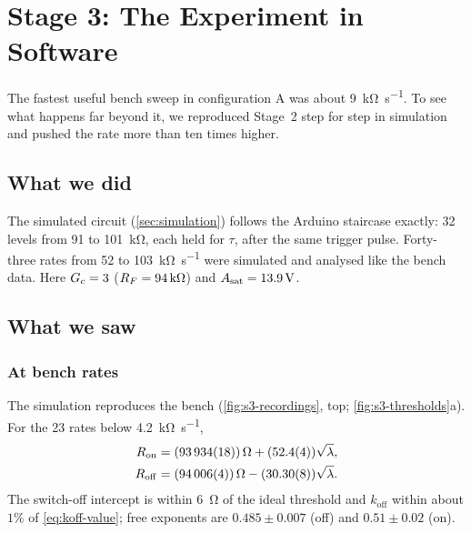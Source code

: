 \chapter{Stage 3: The Experiment in Software}\label{ch:stage3}
\chapterlists

The fastest useful bench sweep in configuration A was about \SI{9}{\kilo\ohm\per\second}. To see what
happens far beyond it, we reproduced Stage~2 step for step in simulation and pushed the rate more than
ten times higher.

\section{What we did}\label{sec:s3-setup}

The simulated circuit (\cref{sec:simulation}) follows the Arduino staircase exactly: 32 levels from
\num{91} to \SI{101}{\kilo\ohm}, each held for $\tau$, after the same trigger pulse. Forty-three rates
from \SI{52}{\ohmpersec} to \SI{103}{\kilo\ohm\per\second} were simulated and analysed like the bench data.
Here $\Gc=3$ ($\RF=\SI{94}{\kilo\ohm}$) and $\Asat=\SI{13.9}{\volt}$.

\section{What we saw}\label{sec:s3-results}

\subsection{At bench rates}

The simulation reproduces the bench (\cref{fig:s3-recordings}, top; \cref{fig:s3-thresholds}a). For the
23 rates below \SI{4.2}{\kilo\ohm\per\second},
\begin{align}
  \Ron  &= (\num{93934 \pm 18})\,\si{\ohm} + (\num{52.4 \pm 0.4})\sqrt{\lambda} , \label{eq:s3-on}\\
  \Roff &= (\num{94006 \pm 4})\,\si{\ohm} - (\num{30.30 \pm 0.08})\sqrt{\lambda} . \label{eq:s3-off}
\end{align}
The switch-off intercept is within \SI{6}{\ohm} of the ideal threshold and $k_{\mathrm{off}}$ within about
$1\%$ of \cref{eq:koff-value}; free exponents are $0.485\pm0.007$ (off) and $0.51\pm0.02$ (on).

